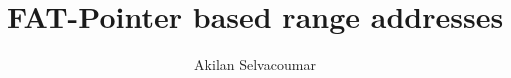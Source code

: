 \documentclass[acmsmall,screen,review]{acmart}
\begin{document}
\title{FAT-Pointer based range addresses}

\author{Akilan Selvacoumar}








\end{document}
